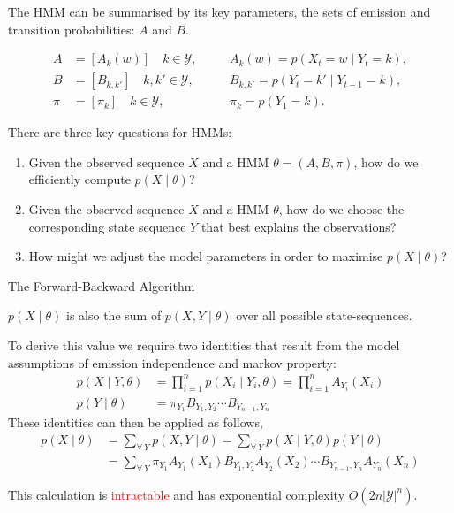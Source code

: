 \documentclass[envcountsect]{beamer}
\begin{document}
\begin{frame}

The HMM can be summarised by its key parameters, the sets of emission and transition probabilities: $A$ and $B$.

\begin{align*}
    A &= [ A_k(w) ] \quad k \in \mathcal{Y}, & \quad & A_k(w) = p(X_t = w \mid Y_t = k), \\
    B  &= [ B_{k,k'} ] \quad k, k' \in \mathcal{Y}, & \quad  & B_{k,k'} = p(Y_t = k' \mid Y_{t-1} = k), \\
    \pi &= [ \pi_k ] \quad k \in \mathcal{Y}, & \quad & \pi_k = p(Y_1 = k).
\end{align*}

\pause

There are three key questions for HMMs:
\begin{enumerate}
    \item Given the observed sequence $X$ and a HMM $\theta = (A, B, \pi)$, how do we efficiently compute $p(X \mid \theta)$?
    \item Given the observed sequence $X$ and a HMM $\theta$, how do we choose the corresponding state sequence $Y$ that best explains the observations?
    \item How might we adjust the model parameters in order to maximise $p(X \mid \theta)$?
\end{enumerate}

\end{frame}

\begin{frame}{The Forward-Backward Algorithm}

$p(X \mid \theta)$ is also the sum of $p(X, Y \mid \theta)$ over all possible state-sequences.

To derive this value we require two identities that result from the model assumptions of emission independence and markov property:
\begin{align*}
    p(X \mid Y, \theta) &= \prod_{i=1}^n p(X_i \mid Y_i, \theta) = \prod_{i=1}^n A_{Y_i}(X_i) \\
    p(Y \mid \theta) &= \pi_{Y_1} B_{Y_1,Y_2} \cdots B_{Y_{n-1},Y_n}
\end{align*}
These identities can then be applied as follows,
\begin{align*}
    p(X \mid \theta) &= \sum_{\forall \: Y} p(X,Y \mid \theta) = \sum_{\forall \: Y} p(X \mid Y, \theta) p(Y \mid \theta) \\
    &= \sum_{\forall \: Y} \pi_{Y_1} A_{Y_1}(X_1) B_{Y_1, Y_2} A_{Y_2}(X_2) \cdots B_{Y_{n-1}, Y_n} A_{Y_n}(X_n)
\end{align*}

\pause

This calculation is \textcolor{red}{intractable} and has exponential complexity $O(2n|\mathcal{Y}|^n)$.

\end{frame}
\end{document}
